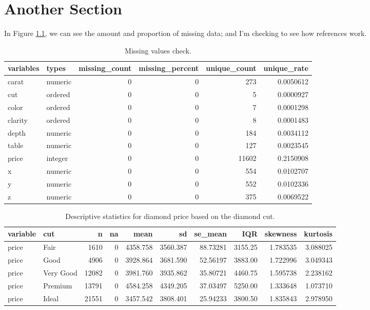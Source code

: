 \documentclass[
    numbers=noenddot,
    open=any,
    paper=a4,
    oneside,
    pagesize,
    captions=tableabove,
    bibliography=totoc,
    11pt
    ]{scrbook}
\begin{document}
\hypertarget{another-section}{%
\chapter{Another Section}\label{another-section}}

In Figure \ref{tab:dlookrdiag}, we can see the amount and proportion of
missing data; and I'm checking to see how references work.

\begin{table}[!h]

\caption{\label{tab:dlookrdiag}Missing values check.}
\centering
\begin{tabular}[t]{llrrrr}
\toprule
variables & types & missing\_count & missing\_percent & unique\_count & unique\_rate\\
\midrule
carat & numeric & 0 & 0 & 273 & 0.0050612\\
cut & ordered & 0 & 0 & 5 & 0.0000927\\
color & ordered & 0 & 0 & 7 & 0.0001298\\
clarity & ordered & 0 & 0 & 8 & 0.0001483\\
depth & numeric & 0 & 0 & 184 & 0.0034112\\
\addlinespace
table & numeric & 0 & 0 & 127 & 0.0023545\\
price & integer & 0 & 0 & 11602 & 0.2150908\\
x & numeric & 0 & 0 & 554 & 0.0102707\\
y & numeric & 0 & 0 & 552 & 0.0102336\\
z & numeric & 0 & 0 & 375 & 0.0069522\\
\bottomrule
\end{tabular}
\end{table}

\begin{table}[!h]

\caption{\label{tab:dlookrdesc}Descriptive statistics for diamond price based on the diamond cut.}
\centering
\begin{tabular}[t]{llrrrrrrrr}
\toprule
variable & cut & n & na & mean & sd & se\_mean & IQR & skewness & kurtosis\\
\midrule
price & Fair & 1610 & 0 & 4358.758 & 3560.387 & 88.73281 & 3155.25 & 1.783535 & 3.088025\\
price & Good & 4906 & 0 & 3928.864 & 3681.590 & 52.56197 & 3883.00 & 1.722996 & 3.049343\\
price & Very Good & 12082 & 0 & 3981.760 & 3935.862 & 35.80721 & 4460.75 & 1.595738 & 2.238162\\
price & Premium & 13791 & 0 & 4584.258 & 4349.205 & 37.03497 & 5250.00 & 1.333648 & 1.073710\\
price & Ideal & 21551 & 0 & 3457.542 & 3808.401 & 25.94233 & 3800.50 & 1.835843 & 2.978950\\
\bottomrule
\end{tabular}
\end{table}
\end{document}
